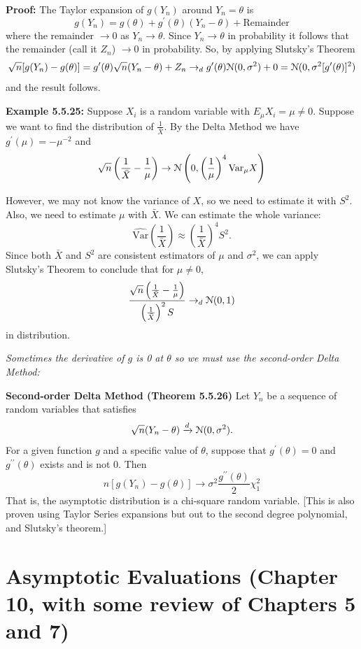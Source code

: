 \documentclass[11pt,]{article}
\def\Xbar{\bar{ X}}
\def\Nsc{{\cal N}}
\def\Var{\mbox{Var}}
\begin{document}
\noindent\textbf{Proof:} The Taylor expansion of \(g(Y_n)\) around
\(Y_n = \theta\) is
\[g(Y_n) = g(\theta) + g^\prime(\theta) (Y_n - \theta) + \mbox{Remainder}\]
where the remainder \(\to 0\) as \(Y_n \to \theta\). Since
\(Y_n \to \theta\) in probability it follows that the remainder (call it
\(Z_n\)) \(\to 0\) in probability. So, by applying Slutsky's Theorem
\[\sqrt{n}[g(Y_n) - g(\theta)] = g^\prime(\theta) \sqrt{n} (Y_n - \theta) + Z_n \to_d g^\prime(\theta)\Nsc(0, \sigma^2) + 0 = \Nsc(0,\sigma^2[g^\prime(\theta)]^2)\]
and the result follows.

\noindent\textbf{Example 5.5.25:} Suppose \(X_i\) is a random variable
with \(E_\mu X_i = \mu \neq 0\). Suppose we want to find the
distribution of \(\frac{1}{\Xbar}\). By the Delta Method we have
\(g^\prime(\mu) = - \mu^{-2}\) and
\[\sqrt{n}\left(\frac{1}{\Xbar} - \frac{1}{\mu} \right) \to \Nsc\left(0, \left( \frac{1}{\mu}\right)^4 \Var_\mu X\right)\]

However, we may not know the variance of \(X\), so we need to estimate
it with \(S^2\). Also, we need to estimate \(\mu\) with \(\Xbar\). We
can estimate the whole variance:
\[\widehat{\Var} \left( \frac{1}{\Xbar} \right) \approx \left(\frac{1}{\Xbar}\right)^4 S^2.\]
Since both \(\Xbar\) and \(S^2\) are consistent estimators of \(\mu\)
and \(\sigma^2\), we can apply Slutsky's Theorem to conclude that for
\(\mu \neq 0\),
\[\frac{\sqrt{n} \left( \frac{1}{\Xbar} - \frac{1} {\mu} \right)}{\left( \frac{1}{\Xbar} \right)^2 S} \to_d \Nsc(0,1)\]
in distribution.

\emph{Sometimes the derivative of \(g\) is 0 at \(\theta\) so we must
use the second-order Delta Method:}

\textbf{Second-order Delta Method (Theorem 5.5.26)} Let \(Y_n\) be a
sequence of random variables that satisfies
\[\sqrt{n}(Y_n - \theta) \xrightarrow{d} \Nsc(0,\sigma^2).\] For a given
function \(g\) and a specific value of \(\theta\), suppose that
\(g^\prime(\theta) = 0\) and \(g^{\prime\prime}(\theta)\) exists and is
not 0. Then
\[n[g(Y_n) - g(\theta)] \to \sigma^2\frac{g^{\prime\prime}(\theta)}{2}\chi^2_1\]
That is, the asymptotic distribution is a chi-square random variable.
{[}This is also proven using Taylor Series expansions but out to the
second degree polynomial, and Slutsky's theorem.{]}

\newpage

\hypertarget{asymptotic-evaluations-chapter-10-with-some-review-of-chapters-5-and-7}{%
\section{Asymptotic Evaluations (Chapter 10, with some review of
Chapters 5 and
7)}\label{asymptotic-evaluations-chapter-10-with-some-review-of-chapters-5-and-7}}
\end{document}

